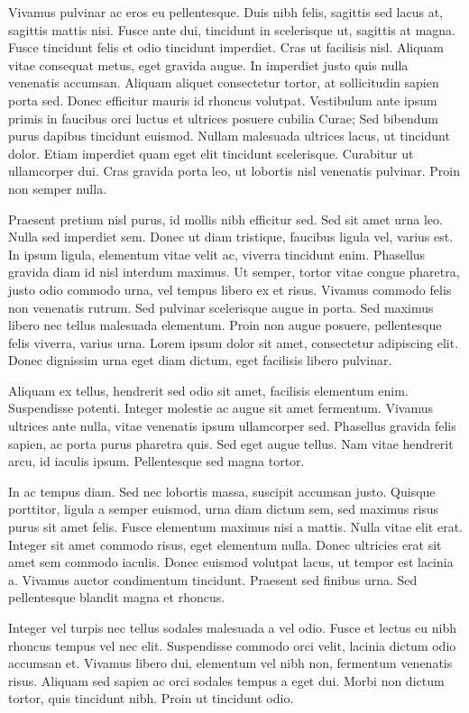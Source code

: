\documentclass[10pt, a4paper, twocolumn]{article} %
\begin{document}
Vivamus pulvinar ac eros eu pellentesque. Duis nibh felis, sagittis sed lacus at, sagittis mattis nisi. Fusce ante dui, tincidunt in scelerisque ut, sagittis at magna. Fusce tincidunt felis et odio tincidunt imperdiet. Cras ut facilisis nisl. Aliquam vitae consequat metus, eget gravida augue. In imperdiet justo quis nulla venenatis accumsan. Aliquam aliquet consectetur tortor, at sollicitudin sapien porta sed. Donec efficitur mauris id rhoncus volutpat. Vestibulum ante ipsum primis in faucibus orci luctus et ultrices posuere cubilia Curae; Sed bibendum purus dapibus tincidunt euismod. Nullam malesuada ultrices lacus, ut tincidunt dolor. Etiam imperdiet quam eget elit tincidunt scelerisque. Curabitur ut ullamcorper dui. Cras gravida porta leo, ut lobortis nisl venenatis pulvinar. Proin non semper nulla.

Praesent pretium nisl purus, id mollis nibh efficitur sed. Sed sit amet urna leo. Nulla sed imperdiet sem. Donec ut diam tristique, faucibus ligula vel, varius est. In ipsum ligula, elementum vitae velit ac, viverra tincidunt enim. Phasellus gravida diam id nisl interdum maximus. Ut semper, tortor vitae congue pharetra, justo odio commodo urna, vel tempus libero ex et risus. Vivamus commodo felis non venenatis rutrum. Sed pulvinar scelerisque augue in porta. Sed maximus libero nec tellus malesuada elementum. Proin non augue posuere, pellentesque felis viverra, varius urna. Lorem ipsum dolor sit amet, consectetur adipiscing elit. Donec dignissim urna eget diam dictum, eget facilisis libero pulvinar.

Aliquam ex tellus, hendrerit sed odio sit amet, facilisis elementum enim. Suspendisse potenti. Integer molestie ac augue sit amet fermentum. Vivamus ultrices ante nulla, vitae venenatis ipsum ullamcorper sed. Phasellus gravida felis sapien, ac porta purus pharetra quis. Sed eget augue tellus. Nam vitae hendrerit arcu, id iaculis ipsum. Pellentesque sed magna tortor.

In ac tempus diam. Sed nec lobortis massa, suscipit accumsan justo. Quisque porttitor, ligula a semper euismod, urna diam dictum sem, sed maximus risus purus sit amet felis. Fusce elementum maximus nisi a mattis. Nulla vitae elit erat. Integer sit amet commodo risus, eget elementum nulla. Donec ultricies erat sit amet sem commodo iaculis. Donec euismod volutpat lacus, ut tempor est lacinia a. Vivamus auctor condimentum tincidunt. Praesent sed finibus urna. Sed pellentesque blandit magna et rhoncus.

Integer vel turpis nec tellus sodales malesuada a vel odio. Fusce et lectus eu nibh rhoncus tempus vel nec elit. Suspendisse commodo orci velit, lacinia dictum odio accumsan et. Vivamus libero dui, elementum vel nibh non, fermentum venenatis risus. Aliquam sed sapien ac orci sodales tempus a eget dui. Morbi non dictum tortor, quis tincidunt nibh. Proin ut tincidunt odio.
\end{document}
